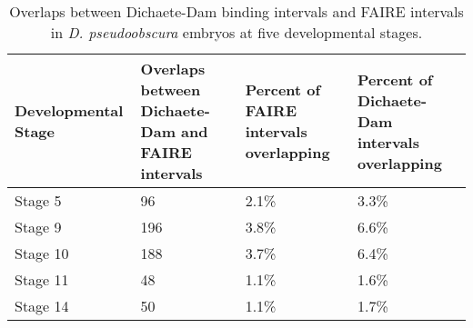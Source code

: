 \begin{table}[h]
\centering
\begin{tabular}{|l|p{3cm}|p{3cm}|p{3cm}|}
\hline
\textbf{Developmental Stage} & \textbf{Overlaps between Dichaete-Dam and FAIRE intervals} & \textbf{Percent of FAIRE intervals overlapping} & \textbf{Percent of Dichaete-Dam intervals overlapping} \\ \hline
Stage 5             & 96                                                & 2.1\%                                  & 3.3\%                                         \\ \hline
Stage 9             & 196                                               & 3.8\%                                  & 6.6\%                                         \\ \hline
Stage 10            & 188                                               & 3.7\%                                  & 6.4\%                                         \\ \hline
Stage 11            & 48                                                & 1.1\%                                  & 1.6\%                                         \\ \hline
Stage 14            & 50                                                & 1.1\%                                  & 1.7\%                                         \\ \hline
\end{tabular}
\caption{Overlaps between Dichaete-Dam binding intervals and FAIRE intervals in \emph{D. pseudoobscura} embryos at five developmental stages.}
\label{Table 6.5}
\end{table}

